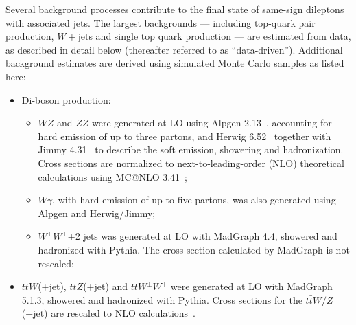 
Several background processes contribute to the final state of same-sign dileptons with associated jets.
The largest backgrounds --- including top-quark pair production, $W+$jets and single top quark production ---
are estimated from data, as described in detail below (thereafter referred to as ``data-driven''). Additional
background estimates are derived using simulated Monte Carlo samples as listed here:
\begin{itemize}
\item Di-boson production:
  \begin{itemize}
  \item $WZ$ and $ZZ$ were generated at LO using {\sc Alpgen} 2.13~\cite{Mangano:2002ea}, accounting for 
    hard emission of up to three partons, and {\sc Herwig} 6.52~\cite{COR-0001} together with
    {\sc Jimmy} 4.31~\cite{JButterworth:1996zw} to describe the 
    soft emission, showering and hadronization. Cross sections are 
    normalized to next-to-leading-order (NLO) theoretical calculations using 
    {\sc MC@NLO} 3.41~\cite{Frixione:2002ik};
  \item $W\gamma$, with hard emission of up to five partons, was also generated using {\sc Alpgen} and 
    {\sc Herwig/Jimmy};
  \item $W^{\pm}W^{\pm}$+2 jets was generated at LO with {\sc MadGraph} 4.4, 
    showered and hadronized with
    {\sc Pythia}. The cross section calculated by {\sc MadGraph} is not rescaled;
  \end{itemize} 
\item $t\bar{t}W$(+jet), $t\bar{t}Z$(+jet) and $t\bar{t}W^{\pm}W^{\mp}$ were generated at LO with
  {\sc MadGraph} 5.1.3, 
  showered and hadronized with {\sc Pythia}. Cross sections for the $t\bar{t}W/Z$(+jet)
  are rescaled to NLO calculations~\cite{Campbell:2012dh,Garzelli:2011is}.
\end{itemize}

